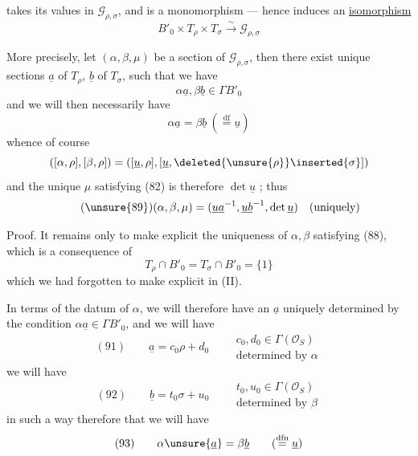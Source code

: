 
 takes its values in $\mathcal G_{\rho,\sigma}$, and is a monomorphism --- hence induces an \uline{isomorphism}
\[
\tag{87}B'_0\times T_\rho\times T_\sigma\xrightarrow{\sim}\mathcal G_{\rho,\sigma}
\]

More precisely, let  $(\alpha,\beta,\mu)$ be a section of $\mathcal G_{\rho,\sigma}$, then there exist   unique sections  $\underline a$ of $T_\rho$, $\underline b$ of $T_\sigma$, such that we have
\[
\tag{88}\alpha\underline a,\beta\underline b\in\Gamma B'_0
\]
and we will then necessarily have
\[
\alpha\underline a=\beta\underline b\ (\overset{\mathrm{df}}{=}\underline u)
\]
whence of course
\[
([\alpha,\rho],[\beta,\rho])=([\underline u,\rho],[\underline u,\deleted{\unsure{\rho}}\inserted{\sigma}])
\]
and the unique $\mu$ satisfying (82) is therefore $\det\underline u$  ; thus
\[
\tag{\unsure{89}}(\alpha,\beta,\mu)=(\underline u\underline a^{-1},\underline u\underline b^{-1},\det\underline u)\quad\text{(uniquely)}
\]

Proof. It remains only to make explicit the uniqueness of $\alpha,\beta$ satisfying (88), which is a consequence of
\[
\tag{90}T_\rho\cap B'_0=T_\sigma\cap B'_0=\{1\}
\]
which we had forgotten to make explicit in (II).


In terms of the  datum of $\alpha$, we will therefore have an $\underline a$ uniquely determined by the condition $\alpha\underline a\in\Gamma B'_0$, and we will have
\[
(91)\qquad \underline a=c_0\rho+d_0
\qquad
\begin{gathered}
c_0,d_0\in\Gamma(\mathcal O_S)\\
\text{determined by }\alpha
\end{gathered}
\]
 we will have
\[
(92)\qquad \underline b=t_0\sigma+u_0
\qquad
\begin{gathered}
t_0,u_0\in\Gamma(\mathcal O_S)\\
\text{determined by }\beta
\end{gathered}
\]
in such a way therefore that we will have
\[
(93)\qquad \alpha\unsure{\underline a}=\beta\underline b
\qquad (\overset{\mathrm{dfn}}{=}\underline u)
\]

